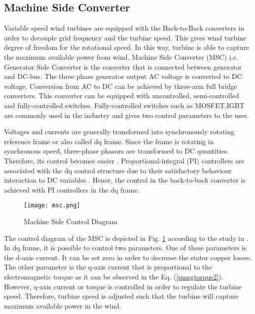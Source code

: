 \subsection{Machine Side Converter}
Variable speed wind turbines are equipped with the Back-to-Back converters in order to decouple grid frequency and the turbine speed. This gives wind turbine degree of freedom for the rotational speed. In this way, turbine is able to capture the maximum available power from wind. Machine Side Converter (MSC) i.e. Generator Side Converter is the converter that is connected between generator and DC-bus. The three phase generator output AC voltage is converted to DC voltage.
Conversion from AC to DC can be achieved by three-arm full bridge converters. This converter can be equipped with uncontrolled, semi-controlled and fully-controlled switches. Fully-controlled switches such as MOSFET,IGBT are commonly used in the industry and gives two control parameters to the user. \par
Voltages and currents are generally transformed into synchronously rotating reference frame or also called dq frame. Since the frame is rotating in synchronous speed, three-phase phasors are transformed to DC quantities. Therefore, its control becomes easier \cite{Kazmierkowski2002}. Proportional-integral (PI) controllers are associated with the dq control structure due to their satisfactory behaviour interaction to DC variables \cite{Blaabjerg2006a}. Hence, the control in the back-to-back converter is achieved with PI controllers in the dq frame. \par
\begin{figure}[h!]
	\centering
	\texttt{[image: msc.png]}
	\caption{Machine Side Control Diagram}
	\label{msc}
\end{figure}
The control diagram of the MSC is depicted in Fig. \ref{msc} according to the study in \cite{Chinchilla2006}. In dq frame, it is possible to control two parameters. One of these parameters is the d-axis current. It can be set zero in order to decrease the stator copper losses. The other parameter is the q-axis current that is proportional to the electromagnetic torque as it can be observed in the Eq. (\ref{pmsgtorque2}). However, q-axis current or torque is controlled in order to regulate the turbine speed. Therefore, turbine speed is adjusted such that the turbine will capture maximum available power in the wind. 
